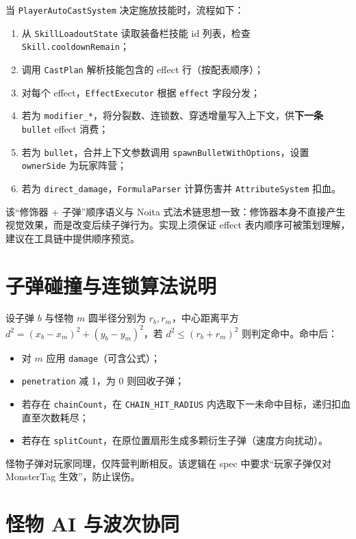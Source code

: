 当 \texttt{PlayerAutoCastSystem} 决定施放技能时，流程如下：
\begin{enumerate}[label=\arabic*.]
  \item 从 \texttt{SkillLoadoutState} 读取装备栏技能 id 列表，检查 \texttt{Skill.cooldownRemain}；
  \item 调用 \texttt{CastPlan} 解析技能包含的 effect 行（按配表顺序）；
  \item 对每个 effect，\texttt{EffectExecutor} 根据 \texttt{effect} 字段分发；
  \item 若为 \texttt{modifier\_*}，将分裂数、连锁数、穿透增量写入上下文，供\textbf{下一条} \texttt{bullet} effect 消费；
  \item 若为 \texttt{bullet}，合并上下文参数调用 \texttt{spawnBulletWithOptions}，设置 \texttt{ownerSide} 为玩家阵营；
  \item 若为 \texttt{direct\_damage}，\texttt{FormulaParser} 计算伤害并 \texttt{AttributeSystem} 扣血。
\end{enumerate}

该“修饰器 + 子弹”顺序语义与 Noita 式法术链思想一致：修饰器本身不直接产生视觉效果，而是改变后续子弹行为\cite{gregory2018game}。实现上须保证 effect 表内顺序可被策划理解，建议在工具链中提供顺序预览。

\section{子弹碰撞与连锁算法说明}

设子弹 $b$ 与怪物 $m$ 圆半径分别为 $r_b, r_m$，中心距离平方 $d^2 = (x_b-x_m)^2 + (y_b-y_m)^2$，若 $d^2 \leq (r_b+r_m)^2$ 则判定命中\cite{helbing2000panic}。命中后：
\begin{itemize}
  \item 对 $m$ 应用 \texttt{damage}（可含公式）；
  \item \texttt{penetration} 减 1，为 0 则回收子弹；
  \item 若存在 \texttt{chainCount}，在 \texttt{CHAIN\_HIT\_RADIUS} 内选取下一未命中目标，递归扣血直至次数耗尽；
  \item 若存在 \texttt{splitCount}，在原位置扇形生成多颗衍生子弹（速度方向扰动）。
\end{itemize}

怪物子弹对玩家同理，仅阵营判断相反。该逻辑在 spec 中要求“玩家子弹仅对 MonsterTag 生效”，防止误伤。

\section{怪物 AI 与波次协同}


